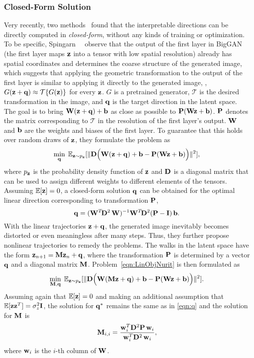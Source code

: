 \subsubsection{Closed-Form Solution}
\label{sec:closed}
Very recently, two methods~\cite{spingarn2021steerability,shen2021closedform} found that the interpretable directions can be directly computed in \textit{closed-form}, without any kinds of training or optimization. 
To be specific, Spingarn~\etal~\cite{spingarn2021steerability} observe that the output of the first layer in BigGAN~\cite{brock2018large} (the first layer maps $\mathbf{z}$ into a tensor with low spatial resolution) already has spatial coordinates and determines the coarse structure of the generated image, which suggests that applying the geometric transformation to the output of the first layer is similar to applying it directly to the generated image, \ie, $G(\mathbf{z}+\mathbf{q})\approx \mathcal{T}\{G(\mathbf{z})\}$ for every $\mathbf{z}$. 
$G$ is a pretrained generator, $\mathcal{T}$ is the desired transformation in the image, and $\mathbf{q}$ is the target direction in the latent space.
The goal is to bring $\mathbf{W}(\mathbf{z}+\mathbf{q})+\mathbf{b}$ as close as possible to $\mathbf{P}(\mathbf{W}\mathbf{z}+\mathbf{b})$.
$\mathbf{P}$ denotes the matrix corresponding to $\mathcal{T}$ in the resolution of the first layer's output. 
$\mathbf{W}$ and $\mathbf{b}$ are the weights and biases of the first layer.
To guarantee that this holds over random draws of $\mathbf{z}$, they formulate the problem as
\begin{equation}
\min_{\q}\;
\E_{\z \sim p_{\z}}
[\|\D\Big(\W(\z+\q)+\bb-\PP(\W\z+\bb)\Big)\|^2],
\label{eqn:LinObjNurit}
\end{equation}
where $p_{\mathbf{z}}$ is the probability density function of $\mathbf{z}$ and $\mathbf{D}$ is a diagonal matrix that can be used to assign different weights to different elements of the tensors. 
Assuming $\mathbb{E}[\mathbf{z}]=0$, a closed-form solution $\mathbf{q}$ can be obtained for the optimal linear direction corresponding to transformation $\mathbf{P}$,
\begin{equation}
\q = (\W^T\!\D^2\,\W)^{-1}\W^T\!\D^2(\PP-\I)\,\bb.
\label{eqn:q}
\end{equation}
With the linear trajectories $\mathbf{z}+\mathbf{q}$, the generated image inevitably becomes distorted or even meaningless after many steps.
Thus, they further propose nonlinear trajectories to remedy the problems. 
The walks in the latent space have the form $\mathbf{z}_{n+1}=\mathbf{M}\mathbf{z}_{n}+\mathbf{q}$, where the transformation $\mathbf{P}$ is determined by a vector $\mathbf{q}$ and a diagonal matrix $\mathbf{M}$.
Problem~\eqref{eqn:LinObjNurit} is then formulated as
\begin{equation}
\min_{\M,\q}\;\E_{\z \sim p_{\z}}[\|\D\Big(\W(\M\z+\q)+\bb-\PP(\W\z+\bb)\Big)\|^2].
\label{eq:LinNonObjNurit}
\end{equation}
Assuming again that $\mathbb{E}[\mathbf{z}]=0$ and making an additional assumption that $\mathbb{E}[\mathbf{z}\mathbf{z}^T]=\sigma^2_z \mathbf{I}$, the solution for $\mathbf{q}^*$ remains the same as in \eqref{eqn:q} and the solution for $\mathbf{M}$ is
\begin{equation}
\M_{i,i} = \frac{\w_i^T\D^2\PP\,\w_i}{\w_i^T\D^2\,\w_i},
\label{eqn:M}
\end{equation}
where $\mathbf{w}_i$ is the $i$-th column of $\mathbf{W}$.

